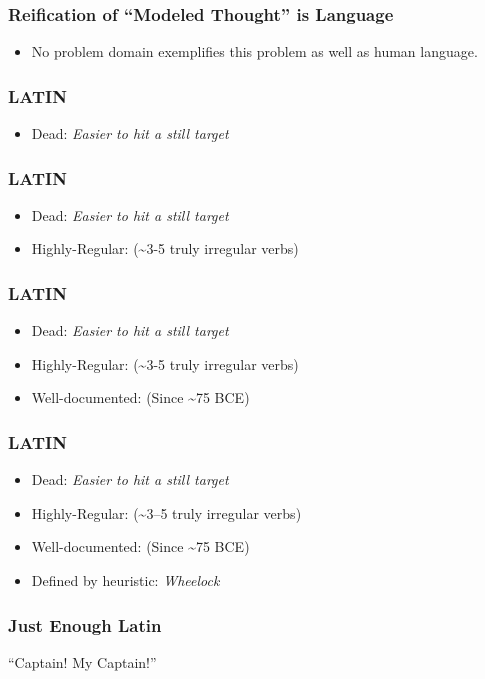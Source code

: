 \documentclass[slidestop,compress,mathserif,notes]{beamer}
\begin{document}
\begin{frame}
	\frametitle{Reification of ``Modeled Thought'' is Language}
	\begin{itemize}
		\item No problem domain exemplifies this problem as well as human language.
	\end{itemize}	
\end{frame}

\begin{frame}
	\frametitle{\textsc{LATIN}}
	\begin{itemize}
		\item Dead:  \emph{Easier to hit a still target}
	\end{itemize}
\end{frame}

\begin{frame}
	\frametitle{\textsc{LATIN}}
	\begin{itemize}
		\item Dead:  \emph{Easier to hit a still target}
		\item Highly-Regular:  (\textasciitilde3-5 truly irregular verbs)
	\end{itemize}
\end{frame}

\begin{frame}
	\frametitle{\textsc{LATIN}}
	\begin{itemize}
		\item Dead:  \emph{Easier to hit a still target}
		\item Highly-Regular:  (\textasciitilde3-5 truly irregular verbs)
		\item Well-documented:  (Since \textasciitilde75 BCE)
	\end{itemize}
\end{frame}

\begin{frame}
	\frametitle{\textsc{LATIN}}
	\begin{itemize}
		\item Dead:  \emph{Easier to hit a still target}
		\item Highly-Regular:  (\textasciitilde3--5 truly irregular verbs)
		\item Well-documented:  (Since \textasciitilde75 BCE)
		\item Defined by heuristic:  \emph{Wheelock}
	\end{itemize}
\end{frame}

\begin{frame}
	\frametitle{Just Enough Latin}
	\vskip 0.5cm
	``Captain!  My Captain!''
\end{frame}
\end{document}
